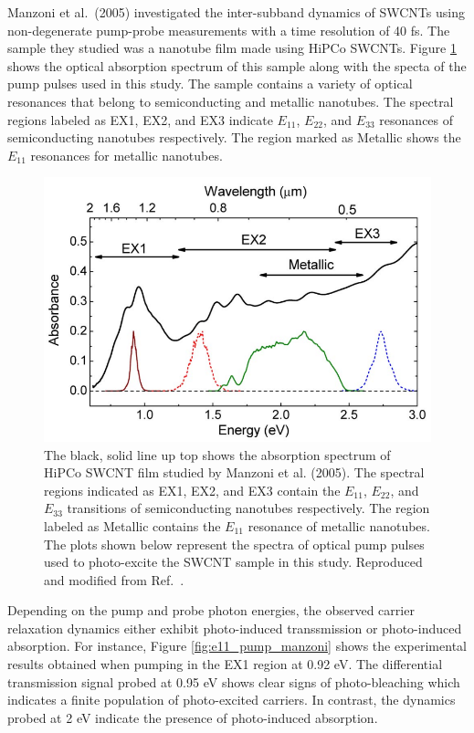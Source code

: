Manzoni et al.\ (2005) investigated the inter-subband dynamics of SWCNTs using non-degenerate pump-probe measurements with a time resolution of 40 fs. The sample they studied was a nanotube film made using HiPCo SWCNTs. Figure \ref{fig:abs_manzoni} shows the optical absorption spectrum of this sample along with the specta of the pump pulses used in this study. The sample contains a variety of optical resonances that belong to semiconducting and metallic nanotubes. The spectral regions labeled as EX1, EX2, and EX3 indicate $E_{11}$, $E_{22}$, and $E_{33}$ resonances of semiconducting nanotubes respectively. The region marked as Metallic shows the $E_{11}$ resonances for metallic nanotubes.


\begin{figure}[ht]
	\centering
	\includegraphics[scale=0.45]{images/chapter_prior_works/abs_manzoni}
	\caption{The black, solid line up top shows the absorption spectrum of HiPCo SWCNT film studied by Manzoni et al. (2005). The spectral regions indicated as EX1, EX2, and EX3 contain the $E_{11}$, $E_{22}$, and $E_{33}$ transitions of semiconducting nanotubes respectively. The region labeled as Metallic contains the $E_{11}$ resonance of metallic nanotubes. The plots shown below represent the spectra of optical pump pulses used to photo-excite the SWCNT sample in this study. Reproduced and modified from Ref.\ \cite{manzoni2005intersubband}.}
	\label{fig:abs_manzoni}
\end{figure}

Depending on the pump and probe photon energies, the observed carrier relaxation dynamics either exhibit photo-induced transsmission or photo-induced absorption. For instance, Figure \ref{fig:e11_pump_manzoni} shows the experimental results obtained when pumping in the EX1 region at 0.92 eV. The differential transmission signal probed at 0.95 eV shows clear signs of photo-bleaching which indicates a finite population of photo-excited carriers. In contrast, the dynamics probed at 2 eV indicate the presence of photo-induced absorption.

